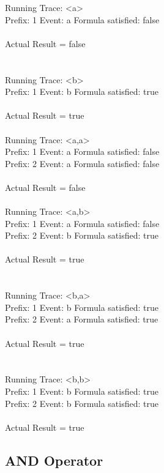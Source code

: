 \newpage

\noindent Running Trace: \textless a\textgreater\\
  Prefix: 1 Event: a Formula satisfied: false\\
\\
Actual Result = false\\
\\
\\
Running Trace: \textless b\textgreater\\
  Prefix: 1 Event: b Formula satisfied: true\\
\\
Actual Result = true\\
\\
Running Trace: \textless a,a\textgreater\\
  Prefix: 1 Event: a Formula satisfied: false\\
  Prefix: 2 Event: a Formula satisfied: false\\
\\
Actual Result = false\\
\\
Running Trace: \textless a,b\textgreater\\
  Prefix: 1 Event: a Formula satisfied: false\\
  Prefix: 2 Event: b Formula satisfied: true\\
\\
Actual Result = true\\
\\
\\
Running Trace: \textless b,a\textgreater\\
  Prefix: 1 Event: b Formula satisfied: true\\
  Prefix: 2 Event: a Formula satisfied: true\\
\\
Actual Result = true\\
\\
\\
Running Trace: \textless b,b\textgreater\\
  Prefix: 1 Event: b Formula satisfied: true\\
  Prefix: 2 Event: b Formula satisfied: true\\
\\
Actual Result = true\\

\subsection{AND Operator}

